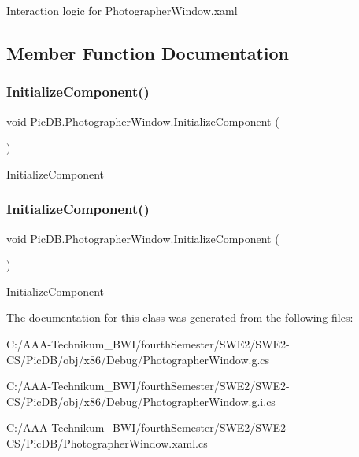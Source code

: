 Interaction logic for Photographer\+Window.\+xaml 

\subsection{Member Function Documentation}
\mbox{\label{class_pic_d_b_1_1_photographer_window_a528826a00b921b4d9c56dc8d5f387090}} 
\subsubsection{\texorpdfstring{Initialize\+Component()}{InitializeComponent()}\hspace{0.1cm}{\footnotesize\ttfamily [1/2]}}
{\footnotesize\ttfamily void Pic\+D\+B.\+Photographer\+Window.\+Initialize\+Component (\begin{DoxyParamCaption}{ }\end{DoxyParamCaption})}



Initialize\+Component 

\mbox{\label{class_pic_d_b_1_1_photographer_window_a528826a00b921b4d9c56dc8d5f387090}} 
\subsubsection{\texorpdfstring{Initialize\+Component()}{InitializeComponent()}\hspace{0.1cm}{\footnotesize\ttfamily [2/2]}}
{\footnotesize\ttfamily void Pic\+D\+B.\+Photographer\+Window.\+Initialize\+Component (\begin{DoxyParamCaption}{ }\end{DoxyParamCaption})}



Initialize\+Component 



The documentation for this class was generated from the following files\+:\begin{DoxyCompactItemize}
\item 
C\+:/\+A\+A\+A-\/\+Technikum\+\_\+\+B\+W\+I/fourth\+Semester/\+S\+W\+E2/\+S\+W\+E2-\/\+C\+S/\+Pic\+D\+B/obj/x86/\+Debug/Photographer\+Window.\+g.\+cs\item 
C\+:/\+A\+A\+A-\/\+Technikum\+\_\+\+B\+W\+I/fourth\+Semester/\+S\+W\+E2/\+S\+W\+E2-\/\+C\+S/\+Pic\+D\+B/obj/x86/\+Debug/Photographer\+Window.\+g.\+i.\+cs\item 
C\+:/\+A\+A\+A-\/\+Technikum\+\_\+\+B\+W\+I/fourth\+Semester/\+S\+W\+E2/\+S\+W\+E2-\/\+C\+S/\+Pic\+D\+B/Photographer\+Window.\+xaml.\+cs\end{DoxyCompactItemize}
